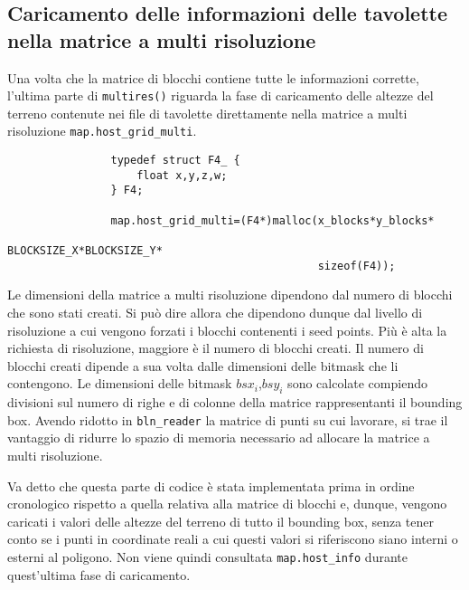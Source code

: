 		\subsection{Caricamento delle informazioni delle tavolette nella matrice a multi risoluzione}
			Una volta che la matrice di blocchi contiene tutte le informazioni corrette, l'ultima parte di \texttt{multires()} riguarda la fase di caricamento delle altezze del terreno contenute nei file di tavolette direttamente nella matrice a multi risoluzione \texttt{map.host\_grid\_multi}.\\
			\begin{verbatim}
				typedef struct F4_ {
				    float x,y,z,w;
				} F4;

				map.host_grid_multi=(F4*)malloc(x_blocks*y_blocks*
				                                BLOCKSIZE_X*BLOCKSIZE_Y*
				                                sizeof(F4));
			\end{verbatim}
			Le dimensioni della matrice a multi risoluzione dipendono dal numero di blocchi che sono stati creati. Si pu\`{o} dire allora che dipendono dunque dal livello di risoluzione a cui vengono forzati i blocchi contenenti i seed points. Pi\`{u} \`{e} alta la richiesta di risoluzione, maggiore \`{e} il numero di blocchi creati. Il numero di blocchi creati dipende a sua volta dalle dimensioni delle bitmask che li contengono. Le dimensioni delle bitmask $bsx_i$,$bsy_i$ sono calcolate compiendo divisioni sul numero di righe e di colonne della matrice rappresentanti il bounding box. Avendo ridotto in \texttt{bln\_reader} la matrice di punti su cui lavorare, si trae il vantaggio di ridurre lo spazio di memoria necessario ad allocare la matrice a multi risoluzione.

			Va detto che questa parte di codice \`{e} stata implementata prima in ordine cronologico rispetto a quella relativa alla matrice di blocchi e, dunque, vengono caricati i valori delle altezze del terreno di tutto il bounding box, senza tener conto se i punti in coordinate reali a cui questi valori si riferiscono siano interni o esterni al poligono. Non viene quindi consultata \texttt{map.host\_info} durante quest'ultima fase di caricamento.

